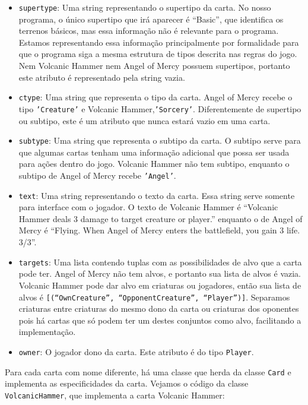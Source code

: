 \begin{itemize}
  \item\texttt{supertype}: Uma string representando o supertipo da carta. No nosso programa,
  o único supertipo que irá aparecer é ``Basic'', que identifica os terrenos básicos, mas essa
  informação não é relevante para o programa. Estamos representando essa informação principalmente por formalidade para que o programa siga a mesma estrutura de tipos descrita nas regras do jogo. Nem Volcanic Hammer nem Angel of Mercy
  possuem supertipos, portanto este atributo é representado pela string vazia.
  \item\texttt{ctype}: Uma string que representa o tipo da carta. Angel of Mercy recebe o tipo
  \texttt{'Creature'} e Volcanic Hammer,\texttt{'Sorcery'}. Diferentemente de supertipo ou subtipo,
  este é um atributo que nunca estará vazio em uma carta.
  \item\texttt{subtype}: Uma string que representa o subtipo da carta. O subtipo serve para que
  algumas cartas tenham uma informação adicional que possa ser usada para ações dentro do jogo.
  Volcanic Hammer não tem subtipo, enquanto o subtipo de Angel of Mercy recebe \texttt{'Angel'}.
  \item\texttt{text}: Uma string representando o texto da carta. Essa string serve somente para
  interface com o jogador. O texto de Volcanic Hammer é ``Volcanic Hammer deals 3 damage to target
  creature or player.'' enquanto o de Angel of Mercy é ``Flying. When Angel of Mercy enters the
  battlefield, you gain 3 life. 3/3''.
  \item\texttt{targets}: Uma lista contendo tuplas com as possibilidades de alvo que a carta
  pode ter. Angel of Mercy não tem alvos, e portanto sua lista de alvos é vazia. Volcanic Hammer
  pode dar alvo em criaturas ou jogadores, então sua lista de alvos é
  \texttt{[(``OwnCreature'', ``OpponentCreature'', ``Player'')]}. Separamos criaturas  entre
  criaturas do mesmo dono da carta ou criaturas dos oponentes pois há cartas que só podem ter
  um destes conjuntos como alvo, facilitando a implementação.
  \item\texttt{owner}: O jogador dono da carta. Este atributo é do tipo \texttt{Player}.
\end{itemize}
Para cada carta com nome diferente, há uma classe que herda da classe \texttt{Card} e implementa
as especificidades da carta. Vejamos o código da classe \texttt{VolcanicHammer}, que implementa
a carta Volcanic Hammer:
\begin{figure}
  
\end{figure}

